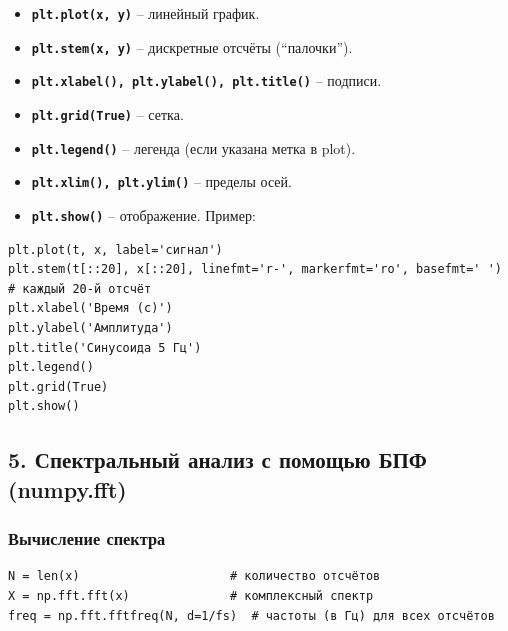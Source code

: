 \documentclass[12pt,a4paper,openany]{book}
\providecommand{\tightlist}{\setlength{\itemsep}{0pt}\setlength{\parskip}{0pt}}
\begin{document}
\begin{itemize}
\tightlist
\item
  \textbf{\texttt{plt.\allowbreak{}plot(\allowbreak{}x,\allowbreak{}\ y)}} -- линейный график.
\item
  \textbf{\texttt{plt.\allowbreak{}stem(\allowbreak{}x,\allowbreak{}\ y)}} -- дискретные отсчёты (``палочки'').
\item
  \textbf{\texttt{plt.\allowbreak{}xlabel(\allowbreak{}),\allowbreak{}\ plt.\allowbreak{}ylabel(\allowbreak{}),\allowbreak{}\ plt.\allowbreak{}title(\allowbreak{})}} -- подписи.
\item
  \textbf{\texttt{plt.\allowbreak{}grid(\allowbreak{}True)}} -- сетка.
\item
  \textbf{\texttt{plt.\allowbreak{}legend(\allowbreak{})}} -- легенда (если указана метка в plot).
\item
  \textbf{\texttt{plt.\allowbreak{}xlim(\allowbreak{}),\allowbreak{}\ plt.\allowbreak{}ylim(\allowbreak{})}} -- пределы осей.
\item
  \textbf{\texttt{plt.\allowbreak{}show(\allowbreak{})}} -- отображение.
  Пример:
\end{itemize}

\begin{Verbatim}[fontsize=\small, breaklines, breakanywhere]
plt.plot(t, x, label='сигнал')
plt.stem(t[::20], x[::20], linefmt='r-', markerfmt='ro', basefmt=' ')  # каждый 20-й отсчёт
plt.xlabel('Время (с)')
plt.ylabel('Амплитуда')
plt.title('Синусоида 5 Гц')
plt.legend()
plt.grid(True)
plt.show()
\end{Verbatim}

\subsection*{5. Спектральный анализ с помощью БПФ (numpy.fft)}

\subsubsection*{Вычисление спектра}

\begin{Verbatim}[fontsize=\small, breaklines, breakanywhere]
N = len(x)                     # количество отсчётов
X = np.fft.fft(x)              # комплексный спектр
freq = np.fft.fftfreq(N, d=1/fs)  # частоты (в Гц) для всех отсчётов
\end{Verbatim}
\end{document}
